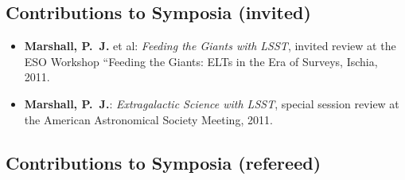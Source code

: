 
\subsection*{Contributions to Symposia (invited)}

\begin{itemize}

\item{\textbf{Marshall, P.~J.} et al:
\textit{Feeding the Giants with LSST},
invited review at the {ESO Workshop ``Feeding the Giants: ELTs in the Era of Surveys}, Ischia, 2011.
}

\item{\textbf{Marshall, P.~J.}:
\textit{Extragalactic Science with LSST},
special session review at the {American Astronomical Society Meeting}, 2011.
}

\end{itemize}

\vspace{2\baselineskip}


\subsection*{Contributions to Symposia (refereed)}

